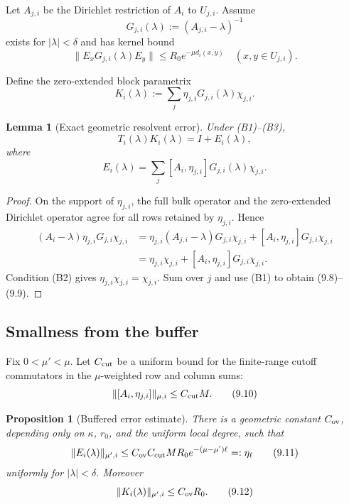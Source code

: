 \documentclass[11pt]{article}
\newtheorem{lemma}[theorem]{Lemma}
\newtheorem{proposition}[theorem]{Proposition}
\begin{document}
Let \(A_{j,i}\) be the Dirichlet restriction of \(A_i\) to \(U_{j,i}\).
Assume
\[
 G_{j,i}(\lambda):=(A_{j,i}-\lambda)^{-1}
 \tag{9.5}
\]
exists for \(|\lambda|<\delta\) and has kernel bound
\[
 \|E_xG_{j,i}(\lambda)E_y\|
 \leq R_0e^{-\mu d_i(x,y)}
 \quad(x,y\in U_{j,i}).
 \tag{9.6}
\]

Define the zero-extended block parametrix
\[
 K_i(\lambda):=
 \sum_j\eta_{j,i}G_{j,i}(\lambda)\chi_{j,i}.
 \tag{9.7}
\]

\begin{lemma}[Exact geometric resolvent error]
\label{lem:v11v9-error}
Under (B1)--(B3),
\[
 T_i(\lambda)K_i(\lambda)=I+E_i(\lambda),
 \tag{9.8}
\]
where
\[
 E_i(\lambda)=
 \sum_j[A_i,\eta_{j,i}]
 G_{j,i}(\lambda)\chi_{j,i}.
 \tag{9.9}
\]
\end{lemma}

\begin{proof}
On the support of \(\eta_{j,i}\), the full bulk operator and the
zero-extended Dirichlet operator agree for all rows retained by
\(\eta_{j,i}\).  Hence
\[
\begin{split}
 (A_i-\lambda)\eta_{j,i}G_{j,i}\chi_{j,i}
 &=
 \eta_{j,i}(A_{j,i}-\lambda)G_{j,i}\chi_{j,i}
 +[A_i,\eta_{j,i}]G_{j,i}\chi_{j,i}\\
 &=
 \eta_{j,i}\chi_{j,i}
 +[A_i,\eta_{j,i}]G_{j,i}\chi_{j,i}.
\end{split}
\]
Condition (B2) gives
\(\eta_{j,i}\chi_{j,i}=\chi_{j,i}\).  Sum over \(j\) and use
(B1) to obtain (9.8)--(9.9).
\end{proof}

\subsection{Smallness from the buffer}

Fix \(0<\mu'<\mu\).  Let \(C_{\rm cut}\) be a uniform bound for the
finite-range cutoff commutators in the \(\mu\)-weighted row and column
sums:
\[
 \|[A_i,\eta_{j,i}]\|_{\mu,i}\leq C_{\rm cut}M.
 \tag{9.10}
\]

\begin{proposition}[Buffered error estimate]
\label{prop:v11v9-buffer}
There is a geometric constant \(C_{\rm ov}\), depending only on
\(\kappa\), \(r_0\), and the uniform local degree, such that
\[
 \|E_i(\lambda)\|_{\mu',i}
 \leq
 C_{\rm ov}C_{\rm cut}MR_0
 e^{-(\mu-\mu')\ell}
 =:\eta_\ell
 \tag{9.11}
\]
uniformly for \(|\lambda|<\delta\).
Moreover
\[
 \|K_i(\lambda)\|_{\mu',i}
 \leq C_{\rm ov}R_0.
 \tag{9.12}
\]
\end{proposition}
\end{document}
